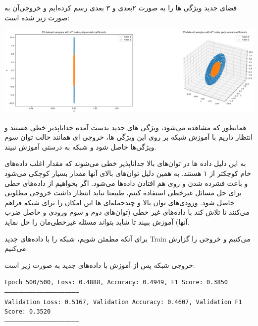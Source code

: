 \begin{enumerate}
\begin{qsolve}
		فضای جدید ویژگی ها را به صورت ۲بعدی و ۳ بعدی رسم کرده‌ایم و خروجی‌آن به صورت زیر شده است:
		
		\begin{center}
			\includegraphics*[width=1\linewidth]{pics/img15.png}
			\label{فضای جدید ویژگی‌ها}
		\end{center}
		
		همانطور که مشاهده می‌شود، ویژگی های جدید بدست آمده جداناپذیر خطی هستند و انتظار داریم با آموزش شبکه بر روی این ویژگی ها، خروجی ای همانند حالت توان سوم ویژگی‌ها حاصل شود و شبکه به درستی آموزش نبیند.
		
		به این دلیل داده ها در توان‌های بالا جداناپذیر خطی می‌شوند که مقدار اغلب داده‌های خام کوچکتر از ۱ هستند. به همین دلیل توان‌های بالای آنها مقدار بسیار کوچکی می‌شود و باعث فشرده شدن و روی هم افتادن داده‌ها می‌شود. اگر بخواهیم از داده‌های خطی برای حل مسائل غیرخطی استفاده کینم، طبیعتا نباید انتظار داشت خروجی مطلوبی حاصل شود. ورودی‌های توان بالا و چند‌جمله‌ای ها این امکان را برای شبکه فراهم می‌کنند تا تلاش کند با داده‌های غیر خطی (توان‌های دوم و سوم ورودی و حاصل ضرب آنها) آموزش ببیند تا شاید بتواند مسئله غیر‌خطی‌مان را حل نماید.
		
برای آنکه مطمئن شویم، شبکه را با داده‌های جدید Train می‌کنیم و خروجی را گزارش می‌کنیم.
		
خروجی شبکه پس از آموزش با داده‌های جدید به صورت زیر است:
	\end{qsolve}
	
	
	
	\begin{qsolve}
		\begin{latin}
			\texttt{Epoch 500/500, Loss: 0.4888, Accuracy: 0.4949, F1 Score: 0.3850}\\
			\texttt{---------------------------------------------------------------}\\
			\texttt{Validation Loss: 0.5167, Validation Accuracy: 0.4607, Validation F1 Score: 0.3520}\\
			\texttt{---------------------------------------------------------------}
		\end{latin}
		

\end{qsolve}
\end{enumerate}
